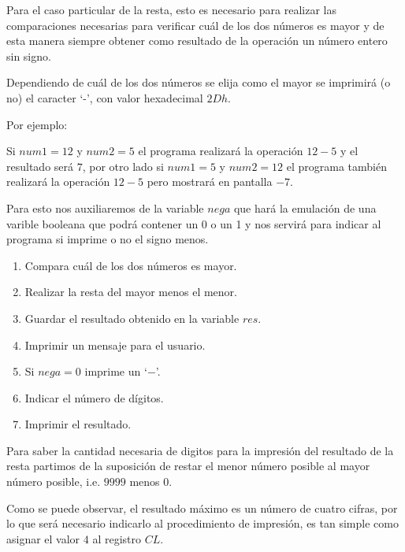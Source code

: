 \documentclass[letter,12 pt,titlepage]{article}
\begin{document}
    Para el caso particular de la resta, esto es necesario para realizar las comparaciones necesarias para verificar cuál de los dos números es mayor y de esta manera siempre obtener como resultado de la operación un número entero sin signo.

    Dependiendo de cuál de los dos números se elija como el mayor se imprimirá (o no) el caracter `-', con valor hexadecimal $2Dh$.

    Por ejemplo:

    Si $num1 = 12$ y $num2 = 5$ el programa realizará la operación $12 - 5$ y el resultado será $7$, por otro lado si $num1 = 5$ y $num2 = 12$ el programa también realizará la operación $12 - 5$ pero mostrará en pantalla $-7$.

    Para esto nos auxiliaremos de la variable $nega$ que hará la emulación de una varible booleana que podrá contener un 0 o un 1 y nos servirá para indicar al programa si imprime o no el signo menos.

    \begin{enumerate}
        \item Compara cuál de los dos números es mayor.
        \item Realizar la resta del mayor menos el menor.
        \item Guardar el resultado obtenido en la variable $res$.
        \item Imprimir un mensaje para el usuario.
        \item Si $nega=0$ imprime un `$-$'.
        \item Indicar el número de dígitos.
        \item Imprimir el resultado.
    \end{enumerate}

    Para saber la cantidad necesaria de digitos para la impresión del resultado de la resta partimos de la suposición de restar el menor número posible al mayor número posible, i.e. $9999$ menos $0$.

    Como se puede observar, el resultado máximo es un número de cuatro cifras, por lo que será necesario indicarlo al procedimiento de impresión, es tan simple como asignar el valor $4$ al registro $CL$.
\end{document}
